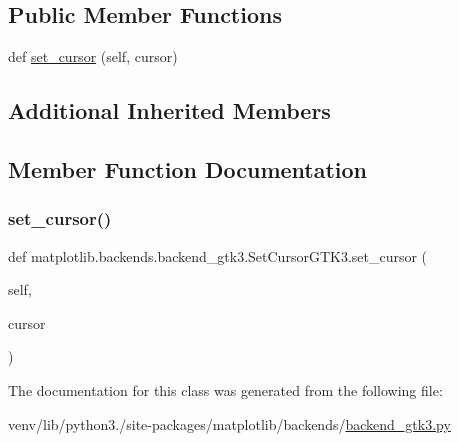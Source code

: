 \subsection*{Public Member Functions}
\begin{DoxyCompactItemize}
\item 
def \hyperlink{classmatplotlib_1_1backends_1_1backend__gtk3_1_1SetCursorGTK3_ac319975b7435c5aa6fa3e8fcc4de9776}{set\+\_\+cursor} (self, cursor)
\end{DoxyCompactItemize}
\subsection*{Additional Inherited Members}


\subsection{Member Function Documentation}
\mbox{\label{classmatplotlib_1_1backends_1_1backend__gtk3_1_1SetCursorGTK3_ac319975b7435c5aa6fa3e8fcc4de9776}} 
\subsubsection{\texorpdfstring{set\+\_\+cursor()}{set\_cursor()}}
{\footnotesize\ttfamily def matplotlib.\+backends.\+backend\+\_\+gtk3.\+Set\+Cursor\+G\+T\+K3.\+set\+\_\+cursor (\begin{DoxyParamCaption}\item[{}]{self,  }\item[{}]{cursor }\end{DoxyParamCaption})}



The documentation for this class was generated from the following file\+:\begin{DoxyCompactItemize}
\item 
venv/lib/python3./site-\/packages/matplotlib/backends/\hyperlink{backend__gtk3_8py}{backend\+\_\+gtk3.\+py}\end{DoxyCompactItemize}

